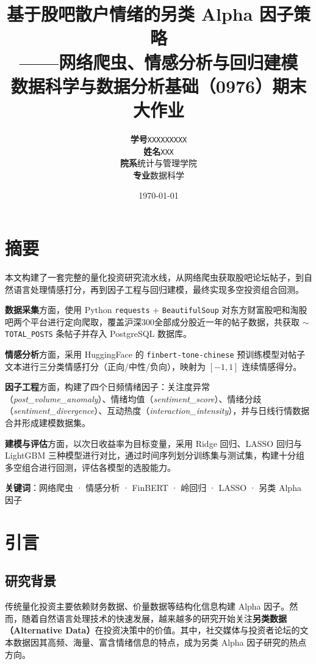 \documentclass[12pt,a4paper]{ctexart}
\title{
    \vspace{2cm}
    {\Huge 基于股吧散户情绪的另类 Alpha 因子策略}\\[0.5cm]
    {\large ——网络爬虫、情感分析与回归建模}\\[1.5cm]
    {\normalsize 数据科学与数据分析基础（0976）期末大作业}
}
\author{
    \vspace{0.5cm}
    \begin{tabular}{rl}
        \textbf{学号} & \texttt{XXXXXXXXX} \\
        \textbf{姓名} & \texttt{XXX} \\
        \textbf{院系} & 统计与管理学院 \\
        \textbf{专业} & 数据科学 \\
    \end{tabular}
}
\date{\today}
\begin{document}
\maketitle
\thispagestyle{empty}

\newpage
\tableofcontents
\newpage

\section{摘要}

本文构建了一套完整的量化投资研究流水线，从网络爬虫获取股吧论坛帖子，到自然语言处理情感打分，再到因子工程与回归建模，最终实现多空投资组合回测。

\textbf{数据采集}方面，使用 Python \texttt{requests} + \texttt{BeautifulSoup} 对东方财富股吧和淘股吧两个平台进行定向爬取，覆盖沪深300全部成分股近一年的帖子数据，共获取 $\sim$\texttt{TOTAL\_POSTS} 条帖子并存入 PostgreSQL 数据库。

\textbf{情感分析}方面，采用 HuggingFace 的 \texttt{finbert-tone-chinese} 预训练模型对帖子文本进行三分类情感打分（正向/中性/负向），映射为 $[-1,1]$ 连续情感得分。

\textbf{因子工程}方面，构建了四个日频情绪因子：关注度异常（\textit{post\_volume\_anomaly}）、情绪均值（\textit{sentiment\_score}）、情绪分歧（\textit{sentiment\_divergence}）、互动热度（\textit{interaction\_intensity}），并与日线行情数据合并形成建模数据集。

\textbf{建模与评估}方面，以次日收益率为目标变量，采用 Ridge 回归、LASSO 回归与 LightGBM 三种模型进行对比，通过时间序列划分训练集与测试集，构建十分组多空组合进行回测，评估各模型的选股能力。

\textbf{关键词}：网络爬虫 · 情感分析 · FinBERT · 岭回归 · LASSO · 另类 Alpha 因子

\newpage

\section{引言}

\subsection{研究背景}

传统量化投资主要依赖财务数据、价量数据等结构化信息构建 Alpha 因子。然而，随着自然语言处理技术的快速发展，越来越多的研究开始关注\textbf{另类数据（Alternative Data）}在投资决策中的价值。其中，社交媒体与投资者论坛的文本数据因其高频、海量、富含情绪信息的特点，成为另类 Alpha 因子研究的热点方向。
\end{document}
